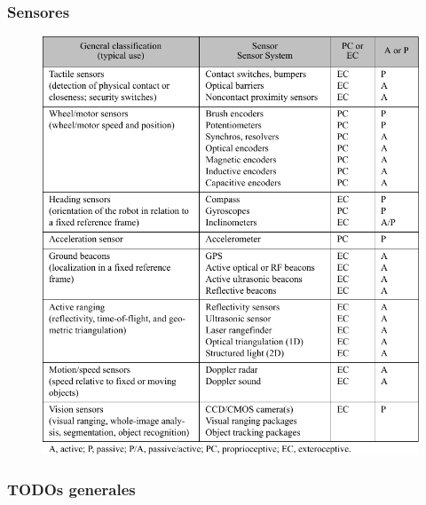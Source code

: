 \begin{frame}
    \frametitle{Sensores}
    
        
    \begin{figure}[!h]
        \centering
        \includegraphics[height=0.8\textheight]{images/sensors_table.pdf}
    \end{figure}
    

\end{frame}



\begin{frame}
    \frametitle{TODOs generales}
\end{frame}



